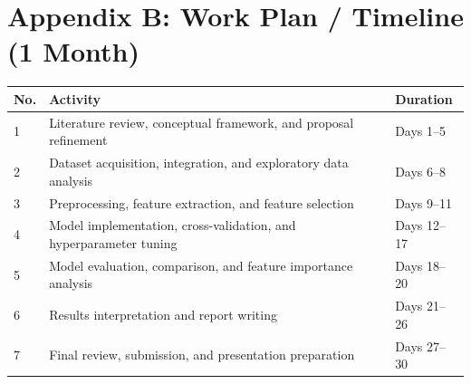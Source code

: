 \documentclass[11pt,letterpaper]{article}
\begin{document}
{\section*{Appendix B: Work Plan / Timeline (1 Month)}
\vspace{0.3em}
\begin{center}
\begin{tabular}{p{0.6cm}p{7.8cm}p{2.8cm}}
\toprule
\textbf{No.} & \textbf{Activity} & \textbf{Duration} \\
\midrule
1 & Literature review, conceptual framework, and proposal refinement  & Days 1--5   \\
2 & Dataset acquisition, integration, and exploratory data analysis   & Days 6--8   \\
3 & Preprocessing, feature extraction, and feature selection          & Days 9--11  \\
4 & Model implementation, cross-validation, and hyperparameter tuning & Days 12--17 \\
5 & Model evaluation, comparison, and feature importance analysis     & Days 18--20 \\
6 & Results interpretation and report writing                         & Days 21--26 \\
7 & Final review, submission, and presentation preparation            & Days 27--30 \\
\bottomrule
\end{tabular}
\end{center}
}
\end{document}
